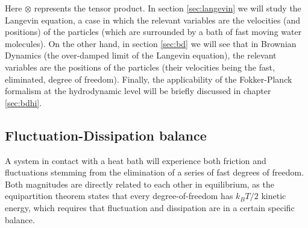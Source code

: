 \documentclass[ twoside,openright,titlepage,numbers=noenddot,%
headinclude,footinclude,cleardoublepage=empty,abstract=on,
BCOR=5mm,paper=b5,fontsize=11pt, dvipsnames
]{scrreprt}
\newcommand{\kT}{k_B T}
\begin{document}
Here $\otimes$ represents the tensor product.
In section \ref{sec:langevin} we will study the Langevin equation, a case in which the relevant variables are the velocities (and positions) of the particles (which are surrounded by a bath of fast moving water molecules). On the other hand, in section \ref{sec:bd} we will see that in Brownian Dynamics (the over-damped limit of the Langevin equation), the relevant variables are the positions of the particles (their velocities being the fast, eliminated, degree of freedom). Finally, the applicability of the Fokker-Planck formalism at the hydrodynamic level will be briefly discussed in chapter \ref{sec:bdhi}.

\subsection{Fluctuation-Dissipation balance}\label{sec:fdb}
A system in contact with a heat bath will experience both friction and fluctuations stemming from the elimination of a series of fast degrees of freedom. Both magnitudes are directly related to each other in equilibrium, as the equipartition theorem states that every degree-of-freedom has $\kT/2$ kinetic energy, which requires that fluctuation and dissipation are in a certain specific balance.
\end{document}

